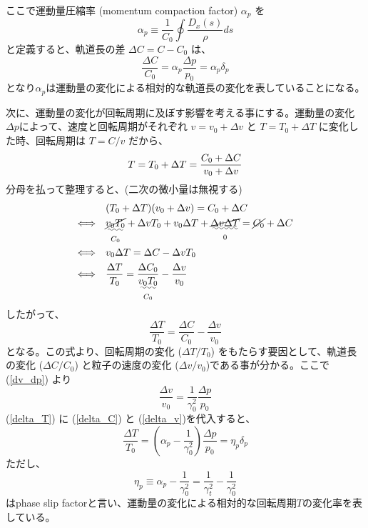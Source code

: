 \documentclass[10pt,a4paper]{ltjsarticle}
\begin{document}
%
ここで運動量圧縮率 (momentum compaction factor) $\alpha_p$ を
%
\begin{equation}
  \alpha_p \equiv \frac{1}{C_0} \oint \frac{D_x(s)}{\rho} ds
\end{equation}
%
と定義すると、軌道長の差 $\Delta C = C-C_0$ は、
%
\begin{equation}
  \frac{\Delta C}{C_0}=\alpha_p\frac{\Delta p}{p_0}=\alpha_p\delta_p
  \label{delta_C}
\end{equation}
%
となり$\alpha_p$は運動量の変化による相対的な軌道長の変化を表していることになる。

次に、運動量の変化が回転周期に及ぼす影響を考える事にする。運動量の変化$\Delta p$によって、速度と回転周期がそれぞれ $v=v_0+\Delta v$ と $T=T_0+\Delta T$ に変化した時、回転周期は $T=C/v$ だから、
%
\begin{equation}
  T = T_0 + \Delta T = \frac{C_0 + \Delta C}{v_0 + \Delta v} \notag
\end{equation}
%
分母を払って整理すると、(二次の微小量は無視する)
%
\begin{align}
  & (T_0 + \Delta T)(v_0 + \Delta v) = C_0 + \Delta C \notag \\
  \Longleftrightarrow\quad & \underset{C_0}{\uwave{\cancel{v_0 T_0}}} + \Delta v T_0 + v_0 \Delta T +
  \underset{0}{\uwave{\cancel{\Delta v \Delta T}}}
  = \cancel{C_0} + \Delta C \notag \\
  \Longleftrightarrow\quad & v_0 \Delta T = \Delta C- \Delta v T_0 \notag \\
  \Longleftrightarrow\quad & \frac{\Delta T}{T_0} = \frac{\Delta C_0}{\underset{C_0}{\uwave{v_0 T_0}}} - \frac{\Delta v}{v_0} \notag
\end{align}
%
したがって、
%
\begin{equation}
  \frac{\Delta T}{T_0} = \frac{\Delta C}{C_0} - \frac{\Delta v}{v_0}
  \label{delta_T}
\end{equation}
%
となる。この式より、回転周期の変化 ($\Delta T/T_0$) をもたらす要因として、軌道長の変化 ($\Delta C/C_0$) と粒子の速度の変化 ($\Delta v/v_0$)である事が分かる。ここで(\ref{dv_dp}) より
%
\begin{equation}
  \frac{\Delta v}{v_0}=\frac{1}{\gamma_0^2}\frac{\Delta p}{p_0}
  \label{delta_v}
\end{equation}
%
(\ref{delta_T}) に (\ref{delta_C}) と (\ref{delta_v})を代入すると、
%
\begin{equation}
  \frac{\Delta T}{T_0} = \left(\alpha_p - \frac{1}{\gamma_0^2}\right)\frac{\Delta p}{p_0} = \eta_p \delta_p
  \label{deltat_eta_deltap}
\end{equation}
%
ただし、
%
\begin{equation}
  \eta_p \equiv \alpha_p - \frac{1}{\gamma_0^2} = \frac{1}{\gamma_t^2} - \frac{1}{\gamma_0^2}
  \label{alppha_slip}
\end{equation}
%
はphase slip factorと言い、運動量の変化による相対的な回転周期$T$の変化率を表している。
%
\end{document}
